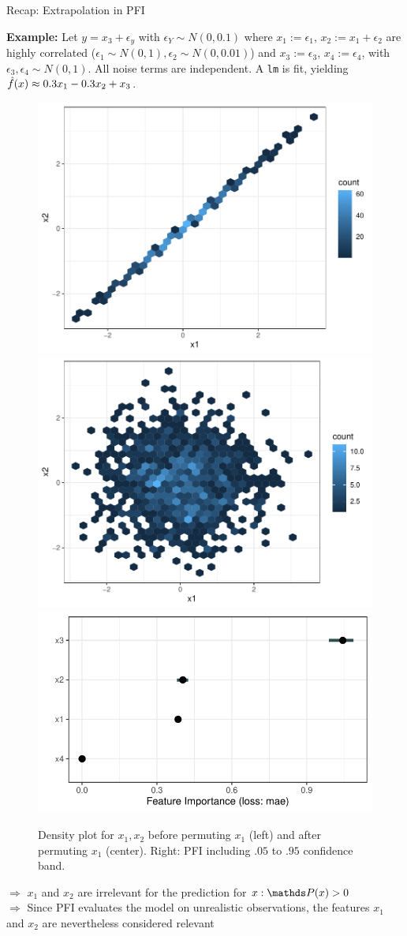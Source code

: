 \documentclass[11pt,compress,t,notes=noshow, xcolor=table]{beamer}
\begin{document}
\begin{vbframe}{Recap: Extrapolation in PFI}
 
 \textbf{Example:} Let $y = x_3 + \epsilon_y$ with $\epsilon_Y \sim N(0, 0.1)$ where $x_1 :=  \epsilon_1$, $x_2 := x_1 + \epsilon_2$ are highly correlated ($\epsilon_1 \sim N(0,1), \epsilon_2 \sim N(0, 0.01)$) and $x_3 := \epsilon_3$, $x_4 := \epsilon_4$,  with $\epsilon_3, \epsilon_4 \sim N(0,1)$. All noise terms are independent.
A \texttt{lm} is fit, yielding $\fh(x) \approx 0.3 x_1 - 0.3 x_2 + x_3$.\\
\begin{figure}
\hfill
  \includegraphics[width=0.25\linewidth]{figure_man/pfi_hexbin_pre.pdf}\hfill
  \includegraphics[width=0.25\linewidth]{figure_man/pfi_hexbin_post.pdf} \hfill
  \includegraphics[width=0.4\linewidth]{figure_man/pfi_extrapolation.pdf} \hfill
  \caption{Density plot for $x_1, x_2$ before permuting $x_1$ (left) and after permuting $x_1$ (center). Right: PFI including $.05$ to $.95$ confidence band.}
\end{figure}
% 
$\Rightarrow$ $x_1$ and $x_2$ are irrelevant for the prediction for $x: \P(x) > 0$ \\
$\Rightarrow$ Since PFI evaluates the model on unrealistic observations, the features $x_1$ and $x_2$ are nevertheless considered relevant

 \end{vbframe}
\end{document}
